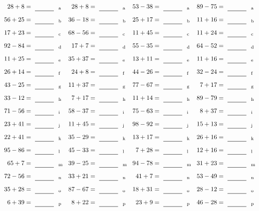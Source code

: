 \documentclass
[
  draft    = true,
  fontsize = 11pt,
  parskip  = half-
]
{scrartcl}
\begin{document}
\clearpage
\begin{align*}
    \pline{28+8}&=\rline{a}
  & \pline{28+8}&=\rline{a}
  & \pline{53-38}&=\rline{a}
  & \pline{89-75}&=\rline{a} \\[1ex]
    \pline{56+25}&=\rline{b}
  & \pline{36-18}&=\rline{b}
  & \pline{25+17}&=\rline{b}
  & \pline{11+16}&=\rline{b} \\[1ex]
    \pline{17+23}&=\rline{c}
  & \pline{68-56}&=\rline{c}
  & \pline{11+45}&=\rline{c}
  & \pline{11+24}&=\rline{c} \\[1ex]
    \pline{92-84}&=\rline{d}
  & \pline{17+7}&=\rline{d}
  & \pline{55-35}&=\rline{d}
  & \pline{64-52}&=\rline{d} \\[1ex]
    \pline{11+25}&=\rline{e}
  & \pline{35+37}&=\rline{e}
  & \pline{13+11}&=\rline{e}
  & \pline{11+16}&=\rline{e} \\[1ex]
    \pline{26+14}&=\rline{f}
  & \pline{24+8}&=\rline{f}
  & \pline{44-26}&=\rline{f}
  & \pline{32-24}&=\rline{f} \\[1ex]
    \pline{43-25}&=\rline{g}
  & \pline{11+37}&=\rline{g}
  & \pline{77-67}&=\rline{g}
  & \pline{7+17}&=\rline{g} \\[1ex]
    \pline{33-12}&=\rline{h}
  & \pline{7+17}&=\rline{h}
  & \pline{11+14}&=\rline{h}
  & \pline{89-79}&=\rline{h} \\[1ex]
    \pline{71-56}&=\rline{i}
  & \pline{58-37}&=\rline{i}
  & \pline{75-63}&=\rline{i}
  & \pline{8+37}&=\rline{i} \\[1ex]
    \pline{23+41}&=\rline{j}
  & \pline{11+45}&=\rline{j}
  & \pline{98-92}&=\rline{j}
  & \pline{15+13}&=\rline{j} \\[1ex]
    \pline{22+41}&=\rline{k}
  & \pline{35-29}&=\rline{k}
  & \pline{13+17}&=\rline{k}
  & \pline{26+16}&=\rline{k} \\[1ex]
    \pline{95-86}&=\rline{l}
  & \pline{45-33}&=\rline{l}
  & \pline{7+28}&=\rline{l}
  & \pline{12+16}&=\rline{l} \\[1ex]
    \pline{65+7}&=\rline{m}
  & \pline{39-25}&=\rline{m}
  & \pline{94-78}&=\rline{m}
  & \pline{31+23}&=\rline{m} \\[1ex]
    \pline{72-56}&=\rline{n}
  & \pline{33+21}&=\rline{n}
  & \pline{41+7}&=\rline{n}
  & \pline{53-49}&=\rline{n} \\[1ex]
    \pline{35+28}&=\rline{o}
  & \pline{87-67}&=\rline{o}
  & \pline{18+31}&=\rline{o}
  & \pline{28-12}&=\rline{o} \\[1ex]
    \pline{6+39}&=\rline{p}
  & \pline{8+22}&=\rline{p}
  & \pline{23+9}&=\rline{p}
  & \pline{46-28}&=\rline{p}
\end{align*}
\end{document}
